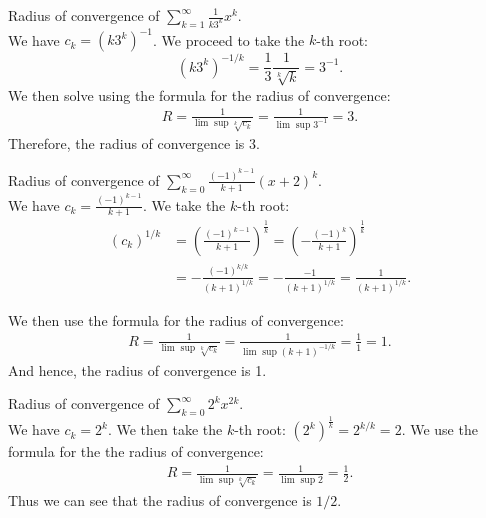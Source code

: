 \documentclass[12pt]{book}
\newenvironment{exercise}[2][Exercise]{\begin{trivlist}
\item[\hskip \labelsep {\bfseries #1}\hskip \labelsep {\bfseries #2.}]}{\end{trivlist}}
\begin{document}
\begin{exercise}{6.4.4}
Radius of convergence of $\sum_{k=1}^\infty \frac{1}{k 3^k}x^k$. \\

We have $c_k = (k 3^k)^{-1}$. We proceed to take the $k$-th root: 
    \[ (k 3^k)^{-1/k} = \frac{1}{3} \frac{1}{\sqrt[k]{k}} = 3^{-1}. \]
We then solve using the formula for the radius of convergence:
    \begin{align*}
    R = \frac{1}{\lim \sup \sqrt[k]{c_k}} = \frac{1}{\lim \sup 3^{-1}} = 3.
    \end{align*}
 Therefore, the radius of convergence is 3.
\end{exercise}



\begin{exercise}{6.4.5}
Radius of convergence of $\sum_{k=0}^\infty \frac{(-1)^{k-1}}{k+1} (x+2)^k$.  \\

We have $c_k= \frac{(-1)^{k-1}}{k+1}$. We take the $k$-th root:
    \begin{align*}
    (c_k)^{1/k} &=  \left( \frac{(-1)^{k-1}}{k+1} \right)^{\frac{1}{k}} = \left(- \frac{(-1)^k}{k+1} \right)^{\frac{1}{k}} \\
                &= - \frac{(-1)^{k/k}}{\left(k+1\right)^{1/k}} = - \frac{-1}{\left(k+1\right)^{1/k}} = \frac{1}{\left(k+1\right)^{1/k}}.
    \end{align*}
    
    We then use the formula for the radius of convergence:
    \begin{align*}
    R = \frac{1}{\lim \sup \sqrt[k]{c_k}} = \frac{1}{\lim \sup \left(k+1\right)^{-1/k}} = \frac{1}{1} = 1.
    \end{align*}
    And hence, the radius of convergence is 1.
\end{exercise}



\begin{exercise}{6.4.8}
Radius of convergence of $\sum_{k=0}^\infty 2^k x^{2k}$.  \\

We have $c_k= 2^k$. We then take the $k$-th root: $\left( 2^k \right)^{\frac{1}{k}} =2^{k/k} = 2$. We use the formula for the the radius of convergence: 
    \begin{align*}
      R = \frac{1}{\lim \sup \sqrt[k]{c_k}} = \frac{1}{\lim \sup 2} = \frac{1}{2}.
    \end{align*}
Thus we can see that the radius of convergence is $1/2$.
\end{exercise}
\end{document}
